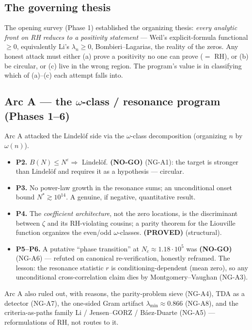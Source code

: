 \documentclass[11pt]{amsart}
\theoremstyle{definition}
\theoremstyle{remark}
\newcommand{\PROVED}{\textbf{(PROVED)}}
\newcommand{\NOGO}{\textbf{(NO-GO)}}
\begin{document}
\subsection{The governing thesis}
The opening survey (Phase 1) established the organizing thesis: \emph{every analytic front on
RH reduces to a positivity statement} --- Weil's explicit-formula functional $\ge0$,
equivalently Li's $\lambda_n\ge0$, Bombieri--Lagarias, the reality of the zeros. Any honest
attack must either (a) prove a positivity no one can prove ($=$ RH), or (b) be circular, or (c)
live in the wrong region. The program's value is in classifying which of (a)--(c) each attempt
falls into.

\subsection{Arc A --- the $\omega$-class / resonance program (Phases 1--6)}
Arc A attacked the Lindel\"of side via the $\omega$-class decomposition (organizing $n$ by
$\omega(n)$).
\begin{itemize}[leftmargin=*]
\item \textbf{P2.} $B(N)\le N^\varepsilon\Rightarrow$ Lindel\"of. \NOGO{} (NG-A1): the target is
stronger than Lindel\"of and requires it as a hypothesis --- circular.
\item \textbf{P3.} No power-law growth in the resonance sums; an unconditional onset bound
$N^*\gtrsim10^{14}$. A genuine, if negative, quantitative result.
\item \textbf{P4.} The \emph{coefficient architecture}, not the zero locations, is the
discriminant between $\zeta$ and its RH-violating cousins; a parity theorem for the Liouville
function organizes the even/odd $\omega$-classes. \PROVED{} (structural).
\item \textbf{P5--P6.} A putative ``phase transition'' at $N_c\approx1.18\cdot10^5$ was
\NOGO{} (NG-A6) --- refuted on canonical re-verification, honestly reframed. The lesson: the
resonance statistic $r$ is conditioning-dependent (mean zero), so any unconditional
cross-correlation claim dies by Montgomery--Vaughan (NG-A3).
\end{itemize}
Arc A also ruled out, with reasons, the parity-problem sieve (NG-A4), TDA as a detector
(NG-A7), the one-sided Gram artifact $\lambda_{\min}\approx0.866$ (NG-A8), and the
criteria-as-paths family Li / Jensen--GORZ / B\'aez-Duarte (NG-A5) --- reformulations of RH,
not routes to it.
\end{document}
